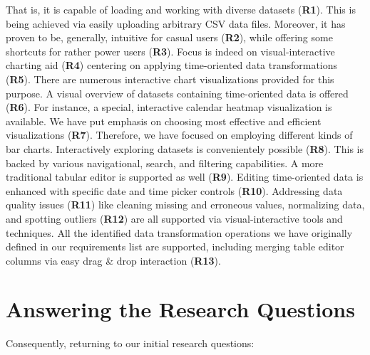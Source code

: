 That is, it is capable of loading and working with diverse datasets (\textbf{R1}).
This is being achieved via easily uploading arbitrary \textsc{CSV} data files.
Moreover, it has proven to be, generally, intuitive for casual users (\textbf{R2}), while offering some shortcuts for rather power users (\textbf{R3}).
Focus is indeed on visual-interactive charting aid (\textbf{R4}) centering on applying time-oriented data transformations (\textbf{R5}).
There are numerous interactive chart visualizations provided for this purpose.
A visual overview of datasets containing time-oriented data is offered (\textbf{R6}).
For instance, a special, interactive calendar heatmap visualization is available.
We have put emphasis on choosing most effective and efficient visualizations (\textbf{R7}).
Therefore, we have focused on employing different kinds of bar charts.
Interactively exploring datasets is convenientely possible (\textbf{R8}).
This is backed by various navigational, search, and filtering capabilities.
A more traditional tabular editor is supported as well (\textbf{R9}).
Editing time-oriented data is enhanced with specific date and time picker controls (\textbf{R10}).
Addressing data quality issues (\textbf{R11}) like cleaning missing and erroneous values, normalizing data, and spotting outliers (\textbf{R12}) are all supported via visual-interactive tools and techniques.
All the identified data transformation operations we have originally defined in our requirements list are supported, including merging table editor columns via easy drag \& drop interaction (\textbf{R13}).


\section{Answering the Research Questions}

Consequently, returning to our initial research questions:

